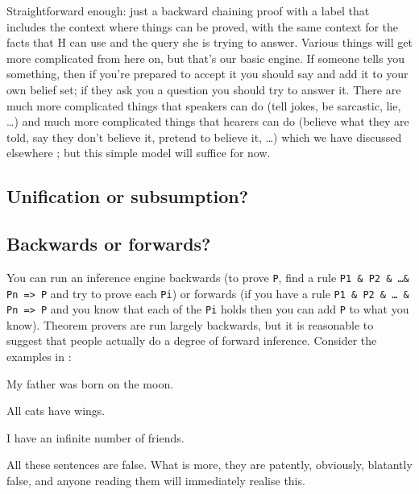 \documentclass[11pt,a4paper]{article}
\begin{document}
\noindent
Straightforward enough: just a backward chaining proof with a label
that includes the context where things can be proved, with the same
context for the facts that H can use and the query she is trying to
answer. Various things will get more complicated from here on, but
that's our basic engine. If someone tells you something, then if
you're prepared to accept it you should say  and add it to your
own belief set; if they ask you a question you should try to answer
it. There are much more complicated things that speakers can do (tell
jokes, be sarcastic, lie, \ldots) and much more complicated things
that hearers can do (believe what they are told, say they don't
believe it, pretend to believe it, \ldots) which we have discussed
elsewhere \citep{Ramsay:06a,Ramsay:06b,Ramsay:08a,Ramsay:09b}; but
this simple model will suffice for now.

\subsection{Unification or subsumption?}

\subsection{Backwards or forwards?}

You can run an inference engine backwards (to prove \texttt{P}, find a rule
\texttt{P1 \& P2 \& \ldots \& Pn => P} and try to prove each
\texttt{Pi}) or forwards (if you have a rule \texttt{P1 \& P2 \& \ldots
  \& Pn => P} and you know that each of the \texttt{Pi} holds then you
can add \texttt{P} to what you know). Theorem provers are run largely
backwards, but it is reasonable to suggest that people actually do a
degree of forward inference. Consider the examples in :

\begin{examples}
\item \label{ABSURDS}
\begin{examples}
\item
My father was born on the moon.
\item
All cats have wings.
\item
I have an infinite number of friends.
\end{examples}
\end{examples}

\noindent
All these sentences are false. What is more, they are patently,
obviously, blatantly false, and anyone reading them will immediately
realise this.
\end{document}
